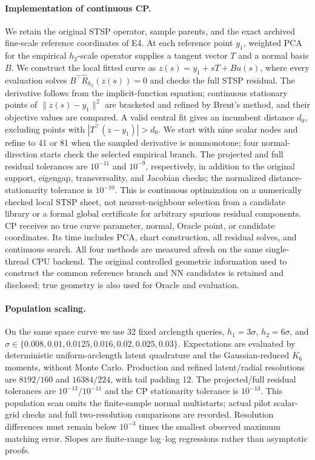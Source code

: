 \paragraph{Implementation of continuous CP.}
We retain the original STSP operator, sample parents, and the exact archived fine-scale reference coordinates of E4. At each reference point $y_1$, weighted PCA for the empirical $h_2$-scale operator supplies a tangent vector $T$ and a normal basis $B$. We construct the local fitted curve as $z(s)=y_1+sT+Bu(s)$, where every evaluation solves $B^\top\widehat R_{h_2}(z(s))=0$ and checks the full STSP residual. The derivative follows from the implicit-function equation; continuous stationary points of $\|z(s)-y_1\|^2$ are bracketed and refined by Brent's method, and their objective values are compared. A valid central fit gives an incumbent distance $d_0$, excluding points with $|T^\top(z-y_1)|>d_0$. We start with nine scalar nodes and refine to 41 or 81 when the sampled derivative is nonmonotone; four normal-direction starts check the selected empirical branch. The projected and full residual tolerances are $10^{-11}$ and $10^{-9}$, respectively, in addition to the original support, eigengap, transversality, and Jacobian checks; the normalized distance-stationarity tolerance is $10^{-10}$. This is continuous optimization on a numerically checked local STSP sheet, not nearest-neighbour selection from a candidate library or a formal global certificate for arbitrary spurious residual components. CP receives no true curve parameter, normal, Oracle point, or candidate coordinates. Its time includes PCA, chart construction, all residual solves, and continuous search. All four methods are measured afresh on the same single-thread CPU backend. The original controlled geometric information used to construct the common reference branch and NN candidates is retained and disclosed; true geometry is also used for Oracle and evaluation.

\paragraph{Population scaling.}
On the same space curve we use 32 fixed arclength queries, $h_1=3\sigma$, $h_2=6\sigma$, and $\sigma\in\{0.008,0.01,0.0125,0.016,0.02,0.025,0.03\}$. Expectations are evaluated by deterministic uniform-arclength latent quadrature and the Gaussian-reduced $K_6$ moments, without Monte Carlo. Production and refined latent/radial resolutions are $8192/160$ and $16384/224$, with tail padding 12. The projected/full residual tolerances are $10^{-13}/10^{-11}$ and the CP stationarity tolerance is $10^{-13}$. This population scan omits the finite-sample normal multistarts; actual pilot scalar-grid checks and full two-resolution comparisons are recorded. Resolution differences must remain below $10^{-3}$ times the smallest observed maximum matching error. Slopes are finite-range log--log regressions rather than asymptotic proofs.
